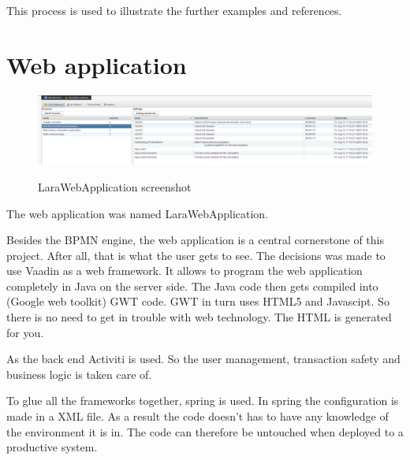 \documentclass[paper=a4,twoside=false,BCOR=0mm,DIV=calc,fontsize=12pt]{scrartcl}
\begin{document}
This process is used to illustrate the further examples and references.



\section{Web application}

\begin{figure}
    \begin{center}
      \includegraphics[width=1\textwidth]{./img/LaraWebApplicationScreenshot.png}\\
    \end{center}
  \caption{LaraWebApplication screenshot}
  \label{webapplicationscreenshot}
\end{figure} 

The web application was named LaraWebApplication.

Besides the BPMN engine, the web application is a central cornerstone of this project. After all, that is what the user gets to see.
The decisions was made to use Vaadin \cite{Vaadin} as a web framework. It allows to program the web application completely in Java on the server side. The Java code then gets compiled into (Google web toolkit) GWT \cite{gwt} code. GWT in turn uses HTML5 and Javascipt. So there is
no need to get in trouble with web technology. The HTML is generated for you.

As the back end Activiti is used. So the user management, transaction safety and business logic is taken care of.

To glue all the frameworks together, spring is used. In spring the configuration is made in a XML file. As a result the code doesn't has to have any 
knowledge of the environment it is in. The code can therefore be untouched when deployed to a productive system.
\end{document}
